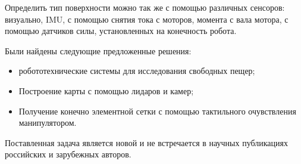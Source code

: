 Определить тип поверхности можно так же с помощью различных сенсоров: визуально, IMU, с помощью снятия тока с моторов, момента с вала мотора, с помощью датчиков силы, установленных на конечность робота.

Были найдены следующие предложенные решения:
\begin{itemize}
    \item робототехнические системы для исследования свободных пещер;
    \item Построение карты с помощью лидаров и камер;
    \item Получение конечно элементной сетки с помощью тактильного очувствления манипулятором.
\end{itemize}

Поставленная задача является новой и не встречается в научных публикациях российских и зарубежных авторов.